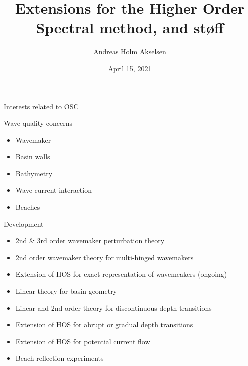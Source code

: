 \documentclass{sintefbeamer}
\title{Extensions for the Higher Order Spectral method, and st{\o}ff}
\author{\href{mailto:andreas.akselsen@sintef.no}{Andreas Holm Akselsen}}
\date{April 15, 2021}
\renewcommand{\_}[1]{_\mr{#1}}
\begin{document}
\maketitle

\newcommand {\framedgraphic}[2] {
    \begin{frame}{#1}
        \begin{center}
            \texttt{[image: \#2]}
        \end{center}
    \end{frame}
}


\begin{frame}{Interests related to OSC}
\vspace{-.5cm}
\begin{minipage}{.25\framewidth}
\small
\begin{block}{Wave quality concerns}
	\begin{itemize}
		\item Wavemaker
		\item Basin walls
		\item Bathymetry
		\item Wave-current interaction
		\item Beaches
	\end{itemize}
	\end{block}
\end{minipage}
\hfill
\begin{minipage}{.7\framewidth}
\small
	\begin{block}{Development}
	\begin{itemize}
		\item 2nd \& 3rd order wavemaker perturbation theory
		\item 2nd order wavemaker theory for multi-hinged wavemakers
		\item Extension of HOS for exact representation of wavemeakers (ongoing)
		\item Linear theory for basin geometry
		\item Linear and 2nd order theory for discontinuous depth transitions
		\item Extension of HOS for abrupt or gradual depth transitions
		\item Extension of HOS for potential current flow		
		\item Beach reflection experiments
	\end{itemize}
	\end{block}
\end{minipage}
\end{frame}
\end{document}
